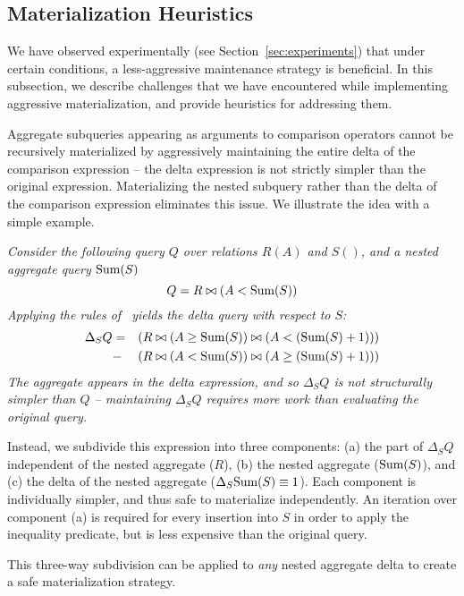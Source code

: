 \subsection{Materialization Heuristics}
\label{sec:advanced-rewriting}

We have observed experimentally (see Section~\ref{sec:experiments}) that under certain conditions, a less-aggressive maintenance strategy is beneficial.
In this subsection, we describe challenges that we have encountered while implementing aggressive materialization, and provide heuristics for addressing them.

Aggregate subqueries appearing as arguments to comparison operators cannot be recursively materialized by aggressively maintaining the entire delta of the comparison expression -- the delta expression is not strictly simpler than the original expression.  Materializing the nested subquery rather than the delta of the comparison expression eliminates this issue.  We illustrate the idea with a simple example.

\begin{example} \em
Consider the following query $Q$ over relations $R(A)$ and $S()$, and a nested aggregate query $\mbox{Sum}(S)$
\vspace*{-0.05in}
{\small $$Q = R \bowtie (A < \mbox{Sum}(S))$$}
Applying the rules of~\cite{koch-pods:10} yields the delta query with respect to $S$:
{\small \begin{eqnarray*}
\Delta_SQ & =  & (R \bowtie (A \geq \mbox{Sum}(S)) \bowtie (A < (\mbox{Sum}(S) +1)))\\
&-& (R \bowtie (A <  \mbox{Sum}(S)) \bowtie (A \geq (\mbox{Sum}(S) + 1)))
\end{eqnarray*}}
The aggregate appears in the delta expression, and so $\Delta_SQ$ is not structurally simpler than $Q$ -- maintaining $\Delta_S Q$ requires more work than evaluating the original query.  

Instead, we subdivide this expression into three components: (a) the part of $\Delta_S Q$ independent of the nested aggregate ($R$), (b) the nested aggregate ($\mbox{Sum}(S)$), and (c) the delta of the nested aggregate ($\Delta_S\mbox{Sum}(S) \equiv 1$).  Each component is individually simpler, and thus safe to materialize independently.  An iteration over component (a) is required for every insertion into $S$ in order to apply the inequality predicate, but is less expensive than the original query.

This three-way subdivision can be applied to {\it any} nested aggregate delta to create a safe materialization strategy.
\end{example}

